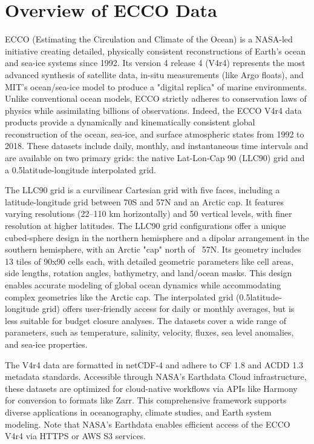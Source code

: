 \pagebreak
\section{Overview of ECCO Data}

\par\vspace{0.25cm}
ECCO (Estimating the Circulation and Climate of the Ocean) is a NASA-led initiative creating detailed, physically consistent reconstructions of Earth's ocean and sea-ice systems since 1992. Its version 4 release 4 (V4r4) represents the most advanced synthesis of satellite data, in-situ measurements (like Argo floats), and MIT's ocean/sea-ice model to produce a "digital replica" of marine environments. Unlike conventional ocean models, ECCO strictly adheres to conservation laws of physics while assimilating billions of observations. Indeed, the ECCO V4r4 data products provide a dynamically and kinematically consistent global reconstruction of the ocean, sea-ice, and surface atmospheric states from 1992 to 2018. These datasets include daily, monthly, and instantaneous time intervals and are available on two primary grids: the native Lat-Lon-Cap 90 (LLC90) grid and a 0.5\textdegree latitude-longitude interpolated grid. 

\par\vspace{0.25cm}
The LLC90 grid is a curvilinear Cartesian grid with five faces, including a latitude-longitude grid between 70\textdegree S and 57\textdegree N and an Arctic cap. It features varying resolutions (22–110 km horizontally) and 50 vertical levels, with finer resolution at higher latitudes. The LLC90 grid configurations offer a unique cubed-sphere design in the northern hemisphere and a dipolar arrangement in the southern hemisphere, with an Arctic "cap" north of ~57\textdegree N. Its geometry includes 13 tiles of 90x90 cells each, with detailed geometric parameters like cell areas, side lengths, rotation angles, bathymetry, and land/ocean masks. This design enables accurate modeling of global ocean dynamics while accommodating complex geometries like the Arctic cap.
The interpolated grid (0.5\textdegree latitude-longitude grid) offers user-friendly access for daily or monthly averages, but is less suitable for budget closure analyses. The datasets cover a wide range of parameters, such as temperature, salinity, velocity, fluxes, sea level anomalies, and sea-ice properties.

\par\vspace{0.25cm}
The V4r4 data are formatted in netCDF-4 and adhere to CF 1.8 and ACDD 1.3 metadata standards. Accessible through NASA's Earthdata Cloud infrastructure, these datasets are optimized for cloud-native workflows via APIs like Harmony for conversion to formats like Zarr. This comprehensive framework supports diverse applications in oceanography, climate studies, and Earth system modeling. Note that NASA's Earthdata enables efficient access of the ECCO V4r4 via HTTPS or AWS S3 services.

